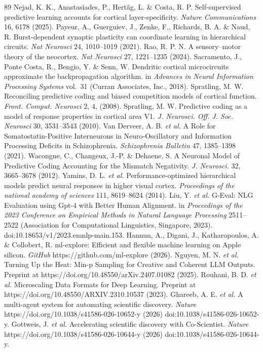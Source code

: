 \documentclass[12pt]{article}
\begin{document}
\begin{thebibliography}{89}
 Nejad, K. K., Anastasiades, P., Hertäg, L. \& Costa, R. P. Self-supervised predictive learning accounts for cortical layer-specificity. \emph{Nature Communications} 16, 6178 (2025).
 Payeur, A., Guerguiev, J., Zenke, F., Richards, B. A. \& Naud, R. Burst-dependent synaptic plasticity can coordinate learning in hierarchical circuits. \emph{Nat Neurosci} 24, 1010--1019 (2021).
 Rao, R. P. N. A sensory--motor theory of the neocortex. \emph{Nat Neurosci} 27, 1221--1235 (2024).
 Sacramento, J., Ponte Costa, R., Bengio, Y. \& Senn, W. Dendritic cortical microcircuits approximate the backpropagation algorithm. in \emph{Advances in Neural Information Processing Systems} vol.~31 (Curran Associates, Inc., 2018).
 Spratling, M. W. Reconciling predictive coding and biased competition models of cortical function. \emph{Front. Comput. Neurosci} 2, 4, (2008).
 Spratling, M. W. Predictive coding as a model of response properties in cortical area V1. \emph{J. Neurosci. Off. J. Soc. Neurosci} 30, 3531--3543 (2010).
 Van Derveer, A. B. \emph{et al.} A Role for Somatostatin-Positive Interneurons in Neuro-Oscillatory and Information Processing Deficits in Schizophrenia. \emph{Schizophrenia Bulletin} 47, 1385--1398 (2021).
 Wacongne, C., Changeux, J.-P. \& Dehaene, S. A Neuronal Model of Predictive Coding Accounting for the Mismatch Negativity. \emph{J. Neurosci.} 32, 3665--3678 (2012).
 Yamins, D. L. \emph{et al.} Performance-optimized hierarchical models predict neural responses in higher visual cortex. \emph{Proceedings of the national academy of sciences} 111, 8619--8624 (2014).
 Liu, Y. \emph{et al.} G-Eval: NLG Evaluation using Gpt-4 with Better Human Alignment. in \emph{Proceedings of the 2023 Conference on Empirical Methods in Natural Language Processing} 2511--2522 (Association for Computational Linguistics, Singapore, 2023). doi:10.18653/v1/2023.emnlp-main.153.
 Hannun, A., Digani, J., Katharopoulos, A. \& Collobert, R. ml-explore: Efficient and flexible machine learning on Apple silicon. \emph{GitHub} https://github.com/ml-explore (2026).
 Nguyen, M. N. \emph{et al.} Turning Up the Heat: Min-p Sampling for Creative and Coherent LLM Outputs. Preprint at https://doi.org/10.48550/arXiv.2407.01082 (2025).
 Rouhani, B. D. \emph{et al.} Microscaling Data Formats for Deep Learning. Preprint at https://doi.org/10.48550/ARXIV.2310.10537 (2023).
 Ghareeb, A. E. \emph{et al.} A multi-agent system for automating scientific discovery. \emph{Nature} https://doi.org/10.1038/s41586-026-10652-y (2026) doi:10.1038/s41586-026-10652-y.
 Gottweis, J. \emph{et al.} Accelerating scientific discovery with Co-Scientist. \emph{Nature} https://doi.org/10.1038/s41586-026-10644-y (2026) doi:10.1038/s41586-026-10644-y.
\end{thebibliography}
\end{document}

